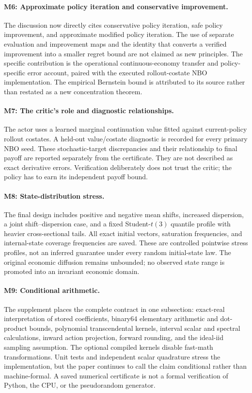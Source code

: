 \paragraph{M6: Approximate policy iteration and conservative improvement.}
The discussion now directly cites conservative policy iteration, safe policy improvement, and approximate modified policy iteration. The use of separate evaluation and improvement maps and the identity that converts a verified improvement into a smaller regret bound are not claimed as new principles. The specific contribution is the operational continuous-economy transfer and policy-specific error account, paired with the executed rollout-costate NBO implementation. The empirical Bernstein bound is attributed to its source rather than restated as a new concentration theorem.

\paragraph{M7: The critic's role and diagnostic relationships.}
The actor uses a learned marginal continuation value fitted against current-policy rollout costates. A held-out value/costate diagnostic is recorded for every primary NBO seed. These stochastic-target discrepancies and their relationship to final payoff are reported separately from the certificate. They are not described as exact derivative errors. Verification deliberately does not trust the critic; the policy has to earn its independent payoff bound.

\paragraph{M8: State-distribution stress.}
The final design includes positive and negative mean shifts, increased dispersion, a joint shift--dispersion case, and a fixed Student-$t(3)$ quantile profile with heavier cross-sectional tails. All exact initial vectors, saturation frequencies, and internal-state coverage frequencies are saved. These are controlled pointwise stress profiles, not an inferred guarantee under every random initial-state law. The original economic diffusion remains unbounded; no observed state range is promoted into an invariant economic domain.

\paragraph{M9: Conditional arithmetic.}
The supplement places the complete contract in one subsection: exact-real interpretation of stored coefficients, binary64 elementary arithmetic and dot-product bounds, polynomial transcendental kernels, interval scalar and spectral calculations, inward action projection, forward rounding, and the ideal-iid sampling assumption. The optional compiled kernels disable fast-math transformations. Unit tests and independent scalar quadrature stress the implementation, but the paper continues to call the claim conditional rather than machine-formal. A saved numerical certificate is not a formal verification of Python, the CPU, or the pseudorandom generator.

